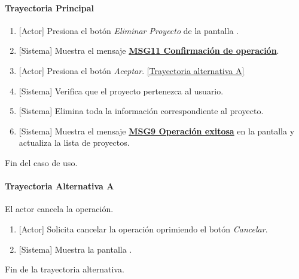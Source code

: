 \paragraph{Trayectoria Principal}
\label{CUW_Eliminar_Proyecto}
	\begin{enumerate}
	    \item {[Actor]} Presiona el botón \textit{Eliminar Proyecto} de la pantalla \textbf{}.
	    
	    \item {[Sistema]} Muestra el mensaje \hyperref[MSG11]{\bf MSG11 Confirmación de operación}.
	    
	    \item {[Actor]} Presiona el botón \textit{Aceptar}. \hyperref[W-PR-CU1.1.5:TA]{[Trayectoria alternativa A]}
	    
	    \item {[Sistema]} Verifica que el proyecto pertenezca al usuario.
	    
	    \item {[Sistema]} Elimina toda la información correspondiente al proyecto.
	    
	    \item {[Sistema]} Muestra el mensaje \hyperref[MSG9]{\bf MSG9 Operación exitosa} en la pantalla \textbf{} y actualiza la lista de proyectos.
	\end{enumerate}
	Fin del caso de uso.
	
\paragraph{Trayectoria Alternativa A} \label{W-PR-CU1.1.5:TA}
	El actor cancela la operación.
	\begin{enumerate}[label=A\arabic*.]
		\item {[Actor]} Solicita cancelar la operación oprimiendo el botón \textit{Cancelar}.
		\item {[Sistema]} Muestra la pantalla \textbf{}.
	\end{enumerate}
	Fin de la trayectoria alternativa.
